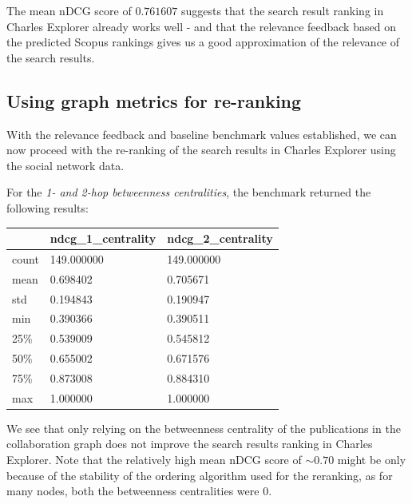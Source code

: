 The mean nDCG score of $0.761607$ suggests that the search result ranking in Charles Explorer already works well - and that the relevance feedback based on the predicted Scopus rankings gives us a good approximation of the relevance of the search results.

\subsection{Using graph metrics for re-ranking}

With the relevance feedback and baseline benchmark values established, we can now proceed with the re-ranking of the search results in Charles Explorer using the social network data.

For the \textit{1- and 2-hop betweenness centralities}, the benchmark returned the following results:

\begin{table}[!ht]
    \centering
    \begin{tabular}{|l|l|l|}
    \hline
        ~ & ndcg\_1\_centrality & ndcg\_2\_centrality \\ \hline
        count & 149.000000 & 149.000000 \\ \hline
        mean & 0.698402 & 0.705671 \\ \hline
        std & 0.194843 & 0.190947 \\ \hline
        min & 0.390366 & 0.390511 \\ \hline
        25\% & 0.539009 & 0.545812 \\ \hline
        50\% & 0.655002 & 0.671576 \\ \hline
        75\% & 0.873008 & 0.884310 \\ \hline
        max & 1.000000 & 1.000000 \\ \hline
    \end{tabular}
\end{table}

We see that only relying on the betweenness centrality of the publications in the collaboration graph does not improve the search results ranking in Charles Explorer.
Note that the relatively high mean nDCG score of $\sim0.70$ might be only because of the stability of the ordering algorithm used for the reranking, as for many nodes, both the betweenness centralities were $0$.

